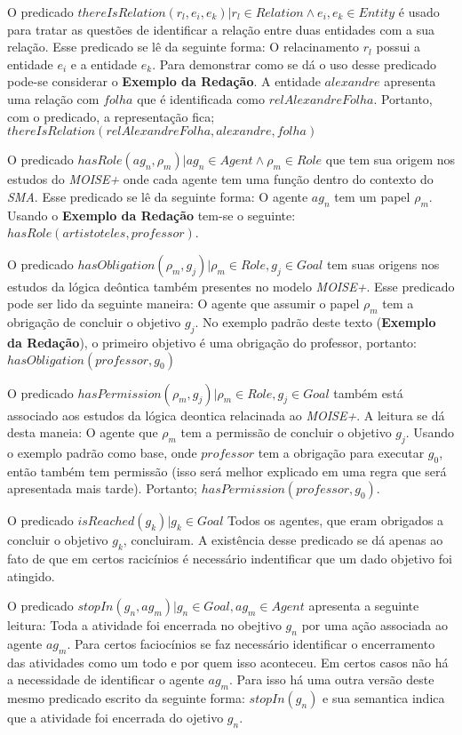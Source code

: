 \label{predic}
O predicado $thereIsRelation(r_l,e_i,e_k) | r_l \in Relation \wedge  e_i, e_k \in Entity$ é usado para tratar as questões de identificar a relação entre 
duas entidades com a sua relação. Esse predicado se lê da seguinte forma: O relacinamento $r_l$ possui a entidade $e_i$ e a entidade
$e_k$. Para demonstrar como se dá o uso desse predicado pode-se considerar o \textbf{Exemplo da Redação}. A entidade $alexandre$ apresenta 
uma relação com $folha$ que é identificada como $relAlexandreFolha$. Portanto, com o predicado, a representação 
fica; $thereIsRelation(relAlexandreFolha,alexandre,folha)$

O predicado $hasRole(ag_n,\rho_m) | ag_n \in Agent \wedge \rho_m \in Role$ que tem sua origem nos estudos do \textit{MOISE+} onde 
cada agente tem uma função dentro do contexto do \textit{SMA}. Esse predicado se lê da seguinte forma: O agente $ag_n$ tem um
papel $\rho_m$. Usando o \textbf{Exemplo da Redação} tem-se o seguinte: $hasRole(artistoteles,professor)$. 

O predicado $hasObligation(\rho_m,g_j) | \rho_m \in Role, g_j \in Goal $ tem suas origens nos estudos da lógica deôntica também 
presentes no modelo \textit{MOISE+}. Esse predicado pode ser lido da seguinte maneira: O agente que assumir o papel $\rho_m$ tem a 
obrigação de concluir o objetivo $g_j$. No exemplo padrão deste texto (\textbf{Exemplo da Redação}), o primeiro objetivo é uma
obrigação do professor, portanto: $hasObligation(professor,g_0)$

O predicado $hasPermission(\rho_m, g_j) | \rho_m \in Role, g_j \in Goal $ também está associado aos estudos da lógica deontica
relacinada ao \textit{MOISE+}. A leitura se dá desta maneia: O agente que $\rho_m$ tem a permissão de concluir o objetivo $g_j$.
Usando o exemplo padrão como base, onde $professor$ tem a obrigação para executar $g_0$, então também tem permissão (isso
será melhor explicado em uma regra que será apresentada mais tarde). Portanto; $hasPermission(professor,g_0)$.  

O predicado $isReached(g_k) | g_k \in Goal $ Todos os agentes, que eram obrigados a concluir o objetivo $g_k$, concluiram. A 
existência desse predicado se dá apenas ao fato de que em certos racicínios é necessário indentificar que um dado objetivo 
foi atingido. 

O predicado $stopIn(g_n, ag_m) | g_n \in Goal, ag_m \in Agent$ apresenta a seguinte leitura: Toda a atividade foi encerrada no
obejtivo $g_n$ por uma ação associada ao agente $ag_m$. Para certos faciocínios se faz necessário identificar o encerramento
das atividades como um todo e por quem isso aconteceu. Em certos casos não há a necessidade de identificar o agente $ag_m$. Para
isso há uma outra versão deste mesmo predicado escrito da seguinte forma: $stopIn(g_n)$ e sua semantica indica que a atividade 
foi encerrada do ojetivo $g_n$.

